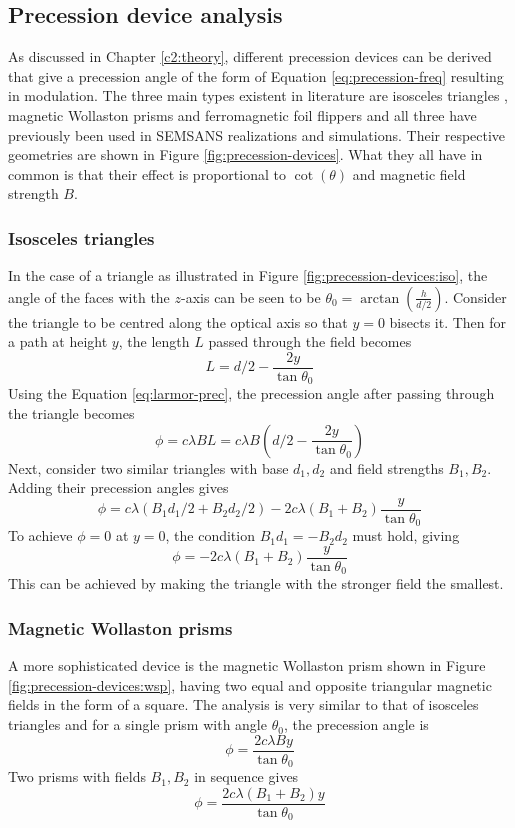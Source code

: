 \documentclass{article}
\begin{document}
\subsection{Precession device analysis}
\label{c3.3}
As discussed in Chapter \ref{c2:theory}, different precession devices can be derived that give a precession angle of the form of Equation \eqref{eq:precession-freq} resulting in modulation. The three main types existent in literature are isosceles triangles \cite{sales2015}, magnetic Wollaston prisms \cite{li2021} and ferromagnetic foil flippers \cite{bouwman2021b} and all three have previously been used in SEMSANS realizations and simulations. Their respective geometries are shown in Figure \ref{fig:precession-devices}. What they all have in common is that their effect is proportional to $\cot(\theta)$ and magnetic field strength $B$.
\subsubsection{Isosceles triangles}
In the case of a triangle as illustrated in Figure \ref{fig:precession-devices:iso}, the angle of the faces with the $z$-axis can be seen to be $\theta_0 = \arctan\left(\frac{h}{d/2}\right)$. Consider the triangle to be centred along the optical axis so that $y=0$ bisects it. Then for a path at height $y$, the length $L$ passed through the field becomes
$$L = d/2 - \frac{2y}{\tan\theta_0}$$
Using the Equation \eqref{eq:larmor-prec}, the precession angle after passing through the triangle becomes
$$\phi = c\lambda B L = c\lambda B(d/2 - \frac{2y}{\tan\theta_0})$$
Next, consider two similar triangles with base $d_1, d_2$ and field strengths $B_1, B_2$. Adding their precession angles gives 
$$\phi = c\lambda (B_1d_1/2 +B_2d_2/2) - 2c\lambda (B_1 + B_2) \frac{y}{\tan\theta_0}$$
To achieve $\phi = 0$ at $y=0$, the condition $B_1d_1 = -B_2d_2$ must hold, giving 
$$\phi = -2c\lambda (B_1 + B_2) \frac{y}{\tan\theta_0}$$
This can be achieved by making the triangle with the stronger field the smallest. 

\subsubsection{Magnetic Wollaston prisms}
A more sophisticated device is the magnetic Wollaston prism shown in Figure \ref{fig:precession-devices:wsp}, having two equal and opposite triangular magnetic fields in the form of a square. The analysis is very similar to that of isosceles triangles and for a single prism with angle $\theta_0$, the precession angle is
$$\phi = \frac{2c\lambda B y}{\tan{\theta_0}}$$
Two prisms with fields $B_1, B_2$ in sequence gives
$$\phi = \frac{2c\lambda (B_1 + B_2) y}{\tan{\theta_0}}$$
\end{document}
